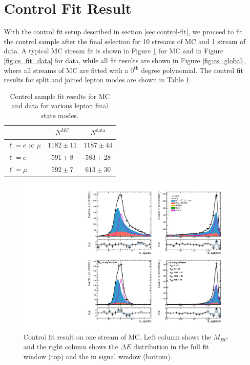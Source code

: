 \section{Control Fit Result}
With the control fit setup described in section \ref{sec:control-fit}, we proceed to fit the control sample after the final selection for 10 streams of MC and 1 stream of data. A typical MC stream fit is shown in Figure \ref{fig:cs_fit_mc} for MC and in Figure \ref{fig:cs_fit_data} for data, while all fit results are shown in Figure \ref{fig:cs_global}, where all streams of MC are fitted with a $0^{\mathrm{th}}$ degree polynomial. The control fit results for split and joined lepton modes are shown in Table \ref{tab:cs_fit_yield}.
\begin{table}[H]
	\centering
	\begin{tabular}{l|c|c}
		
		& $N^{MC}$ & $N^{\mathrm{data}}$ \\
		\toprule
		$\ell = e$ or $\mu$ & $1182 \pm 11$ & $1187 \pm 44$\\
		$\ell = e$ & $591 \pm 8$ & $583 \pm 28$ \\
		$\ell = \mu$ & $592 \pm 7$ & $613 \pm 30$\\
		\bottomrule
	\end{tabular}
	\captionsetup{width=0.8\linewidth}
	\caption{Control sample fit results for MC and data for various lepton final state modes.}
	\label{tab:cs_fit_yield}
\end{table}

\begin{figure}[H]
	\centering
	\captionsetup{width=0.8\linewidth}
	\includegraphics[width=\linewidth]{fig/cs_fit_mc}
	\caption{Control fit result on one stream of MC. Left column shows the $M_{BC}$ and the right column shows the $\Delta E$ distribution in the full fit window (top) and the in signal window (bottom).}
	\label{fig:cs_fit_mc}
\end{figure}


